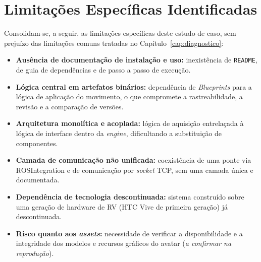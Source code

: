 \section{Limitações Específicas Identificadas}
\label{sec:vr-limitacoes}

Consolidam-se, a seguir, as limitações específicas deste estudo de caso, sem prejuízo das
limitações comuns tratadas no Capítulo~\ref{cap:diagnostico}:

\begin{itemize}
	\item \textbf{Ausência de documentação de instalação e uso:} inexistência de
	      \texttt{README}, de guia de dependências e de passo a passo de execução.
	\item \textbf{Lógica central em artefatos binários:} dependência de \emph{Blueprints}
	      para a lógica de aplicação do movimento, o que compromete a rastreabilidade, a
	      revisão e a comparação de versões.
	\item \textbf{Arquitetura monolítica e acoplada:} lógica de aquisição entrelaçada à
	      lógica de interface dentro da \emph{engine}, dificultando a substituição de
	      componentes.
	\item \textbf{Camada de comunicação não unificada:} coexistência de uma ponte via
	      ROSIntegration e de comunicação por \emph{socket} TCP, sem uma camada única e
	      documentada.
	\item \textbf{Dependência de tecnologia descontinuada:} sistema construído sobre uma
	      geração de hardware de RV (HTC Vive de primeira geração) já descontinuada.
	\item \textbf{Risco quanto aos \emph{assets}:} necessidade de verificar a
	      disponibilidade e a integridade dos modelos e recursos gráficos do avatar
	      (\emph{a confirmar na reprodução}).
\end{itemize}
